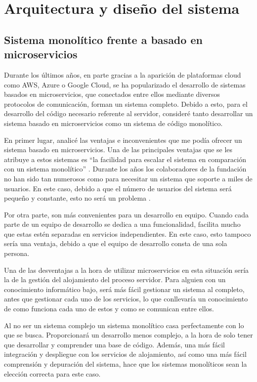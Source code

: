 \section{Arquitectura y diseño del sistema}

\subsection{Sistema monolítico frente a basado en microservicios}

Durante los últimos años, en parte gracias a la aparición de plataformas cloud como AWS, Azure o Google Cloud, se ha popularizado el desarrollo de sistemas basados en microservicios, que conectados entre ellos mediante diversos protocolos de comunicación, forman un sistema completo. Debido a esto, para el desarrollo del código necesario referente al servidor, consideré tanto desarrollar un sistema basado en microservicios como un sistema de código monolítico.

En primer lugar, analicé las ventajas e inconvenientes que me podía ofrecer un sistema basado en microservicios. Una de las principales ventajas que se les atribuye a estos sistemas es ``la facilidad para escalar el sistema en comparación con un sistema monolítico'' \cite{arquitectura-comp1}. Durante los años los colaboradores de la fundación no han sido tan numerosos como para necesitar un sistema que soporte a miles de usuarios. En este caso, debido a que el número de usuarios del sistema será pequeño y constante, esto no será un problema \cite[p.~4]{monolith1}.

Por otra parte, son más convenientes para un desarrollo en equipo. Cuando cada parte de un equipo de desarrollo se dedica a una funcionalidad, facilita mucho que estas estén separadas en servicios independientes. En este caso, esto tampoco sería una ventaja, debido a que el equipo de desarrollo consta de una sola persona. 

Una de las desventajas a la hora de utilizar microservicios en esta situación sería la de la gestión del alojamiento del proceso servidor. Para alguien con un conocimiento informático bajo, será más fácil gestionar un sistema al completo, antes que gestionar cada uno de los servicios, lo que conllevaría un conocimiento de como funciona cada uno de estos y como se comunican entre ellos.

Al no ser un sistema complejo un sistema monolítico casa perfectamente con lo que se busca. Proporcionará un desarrollo menos complejo, a la hora de solo tener que desarrollar y comprender una base de código. Además, una más fácil integración y despliegue con los servicios de alojamiento, así como una más fácil comprensión y depuración del sistema, hace que los sistemas monolíticos sean la elección correcta para este caso.

